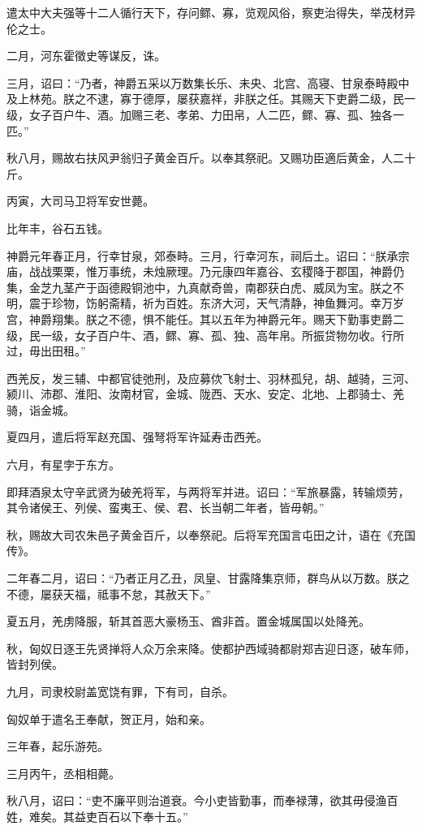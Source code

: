 \documentclass[]{article}
\begin{document}
遣太中大夫强等十二人循行天下，存问鳏、寡，览观风俗，察吏治得失，举茂材异伦之士。

二月，河东霍徵史等谋反，诛。

三月，诏曰：``乃者，神爵五采以万数集长乐、未央、北宫、高寝、甘泉泰畤殿中及上林苑。朕之不逮，寡于德厚，屡获嘉祥，非朕之任。其赐天下吏爵二级，民一级，女子百户牛、酒。加赐三老、孝弟、力田帛，人二匹，鳏、寡、孤、独各一匹。''

秋八月，赐故右扶风尹翁归子黄金百斤。以奉其祭祀。又赐功臣適后黄金，人二十斤。

丙寅，大司马卫将军安世薨。

比年丰，谷石五钱。

神爵元年春正月，行幸甘泉，郊泰畤。三月，行幸河东，祠后土。诏曰：``朕承宗庙，战战栗栗，惟万事统，未烛厥理。乃元康四年嘉谷、玄稷降于郡国，神爵仍集，金芝九茎产于函德殿铜池中，九真献奇兽，南郡获白虎、威凤为宝。朕之不明，震于珍物，饬躬斋精，祈为百姓。东济大河，天气清静，神鱼舞河。幸万岁宫，神爵翔集。朕之不德，惧不能任。其以五年为神爵元年。赐天下勤事吏爵二级，民一级，女子百户牛、酒，鳏、寡、孤、独、高年帛。所振贷物勿收。行所过，毋出田租。''

西羌反，发三辅、中都官徒弛刑，及应募佽飞射士、羽林孤兒，胡、越骑，三河、颍川、沛郡、淮阳、汝南材官，金城、陇西、天水、安定、北地、上郡骑士、羌骑，诣金城。

夏四月，遣后将军赵充国、强弩将军许延寿击西羌。

六月，有星孛于东方。

即拜酒泉太守辛武贤为破羌将军，与两将军并进。诏曰：``军旅暴露，转输烦劳，其令诸侯王、列侯、蛮夷王、侯、君、长当朝二年者，皆毋朝。''

秋，赐故大司农朱邑子黄金百斤，以奉祭祀。后将军充国言屯田之计，语在《充国传》。

二年春二月，诏曰：``乃者正月乙丑，凤皇、甘露降集京师，群鸟从以万数。朕之不德，屡获天福，祗事不怠，其赦天下。''

夏五月，羌虏降服，斩其首恶大豪杨玉、酋非首。置金城属国以处降羌。

秋，匈奴日逐王先贤掸将人众万余来降。使都护西域骑都尉郑吉迎日逐，破车师，皆封列侯。

九月，司隶校尉盖宽饶有罪，下有司，自杀。

匈奴单于遣名王奉献，贺正月，始和亲。

三年春，起乐游苑。

三月丙午，丞相相薨。

秋八月，诏曰：``吏不廉平则治道衰。今小吏皆勤事，而奉禄薄，欲其毋侵渔百姓，难矣。其益吏百石以下奉十五。''
\end{document}
